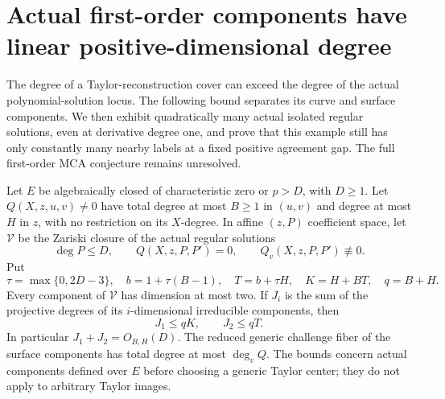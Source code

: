 \section{Actual first-order components have linear positive-dimensional degree}
\label{app:actual-first-order}

The degree of a Taylor-reconstruction cover can exceed the degree of
the actual polynomial-solution locus. The following bound separates
its curve and surface components. We then exhibit quadratically many
actual isolated regular solutions, even at derivative degree one,
and prove that this example still has only constantly many nearby
labels at a fixed positive agreement gap. The full first-order MCA
conjecture remains unresolved.

\begin{theorem}
\label{thm:actual-first-order-components}
Let $E$ be algebraically closed of characteristic zero or $p>D$, with
$D\ge1$. Let $Q(X,z,u,v)\ne0$ have total degree at most $B\ge1$ in
$(u,v)$ and degree at most $H$ in $z$, with no restriction on its
$X$-degree. In affine $(z,P)$ coefficient space, let $\mathcal V$ be
the Zariski closure of the actual regular solutions
\[
 \deg P\le D,\qquad Q(X,z,P,P')=0,\qquad
 Q_v(X,z,P,P')\not\equiv0.
\]
Put
\[
 \tau=\max\{0,2D-3\},\quad b=1+\tau(B-1),\quad
 T=b+\tau H,\quad K=H+BT,\quad q=B+H.
\]
Every component of $\mathcal V$ has dimension at most two. If $J_i$
is the sum of the projective degrees of its $i$-dimensional irreducible
components, then
\[
 J_1\le qK,\qquad J_2\le qT.
\]
In particular $J_1+J_2=O_{B,H}(D)$. The reduced generic challenge
fiber of the surface components has total degree at most $\deg_v Q$.
The bounds concern actual components defined over $E$ before choosing
a generic Taylor center; they do not apply to arbitrary Taylor images.
\end{theorem}
